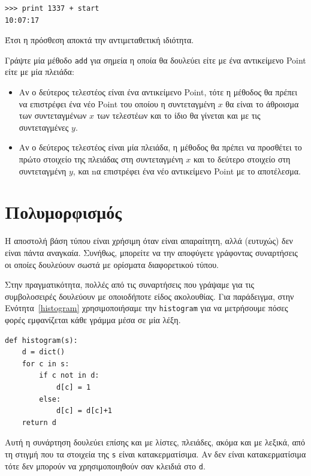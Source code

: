 \documentclass[10pt]{book}
\begin{document}
\begin{verbatim}
>>> print 1337 + start
10:07:17
\end{verbatim}
%
Έτσι η πρόσθεση αποκτά την αντιμεταθετική ιδιότητα.
\\
\begin{exercise}

Γράψτε μία μέθοδο {\tt add} για σημεία η οποία θα δουλεύει είτε με ένα αντικείμενο Point είτε με μία πλειάδα:

\begin{itemize}

 
\item Αν ο δεύτερος τελεστέος είναι ένα αντικείμενο Point, τότε η μέθοδος θα
πρέπει να επιστρέφει ένα νέο Point του οποίου η συντεταγμένη $x$ θα είναι το
άθροισμα των συντεταγμένων $x$ των τελεστέων και το ίδιο θα γίνεται και με τις
συντεταγμένες $y$.

\item Αν ο δεύτερος τελεστέος είναι μία πλειάδα, η μέθοδος θα πρέπει να προσθέτει το
πρώτο στοιχείο της πλειάδας στη συντεταγμένη $x$ και το δεύτερο στοιχείο στη συντεταγμένη
$y$, και nα επιστρέφει ένα νέο αντικείμενο Point με το αποτέλεσμα.

\end{itemize}
\end{exercise}

 
\section{Πολυμορφισμός}

Η αποστολή βάση τύπου είναι χρήσιμη όταν είναι απαραίτητη, αλλά (ευτυχώς) δεν είναι πάντα
αναγκαία. Συνήθως, μπορείτε να την αποφύγετε γράφοντας συναρτήσεις οι οποίες δουλεύουν
σωστά με ορίσματα διαφορετικού τύπου.

Στην πραγματικότητα, πολλές από τις συναρτήσεις που γράψαμε για τις συμβολοσειρές δουλεύουν με οποιοδήποτε
είδος ακολουθίας. Για παράδειγμα, στην Ενότητα~\ref{histogram} χρησιμοποιήσαμε την {\tt histogram} για να
μετρήσουμε πόσες φορές εμφανίζεται κάθε γράμμα μέσα σε μία λέξη.
 

\begin{verbatim}
def histogram(s):
    d = dict()
    for c in s:
        if c not in d:
            d[c] = 1
        else:
            d[c] = d[c]+1
    return d
\end{verbatim}
%
Αυτή η συνάρτηση δουλεύει επίσης και με λίστες, πλειάδες, ακόμα και με λεξικά, από τη στιγμή που τα στοιχεία της
{\tt s} είναι κατακερματίσιμα. Αν δεν είναι κατακερματίσιμα τότε δεν μπορούν να χρησιμοποιηθούν σαν κλειδιά στο
{\tt d}.
\end{document}
